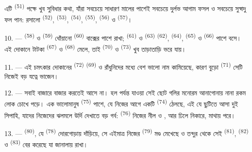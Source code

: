 এটি  \textsuperscript{(51)} পক্ষে খুব সুবিধার কথা, যাঁরা
সবচেয়ে সাধারণ মালের পাশেই সবচেয়ে দুর্লভ আগাম ফসল ও সবচেয়ে সুস্বাদু ফল পান:
রসালো  \textsuperscript{(52)}, 
\textsuperscript{(53)},  \textsuperscript{(54)}, 
\textsuperscript{(55)},  \textsuperscript{(56)} ও 
\textsuperscript{(57)}।

\VUsaut{4.0mm}
\VUsaut{3.0mm}

10. ---  \textsuperscript{(58)} ও  \textsuperscript{(59)}
ধোঁয়ানো  \textsuperscript{(60)} বাক্সের পাশে রাখা;
 \textsuperscript{(61)} ও  \textsuperscript{(63)}
 \textsuperscript{(62)},  \textsuperscript{(64)},
 \textsuperscript{(65)} ও 
\textsuperscript{(66)} পাশে বসে। এই দোকানে টাটকা 
\textsuperscript{(67)} ও  \textsuperscript{(68)} মেলে, তাই
 \textsuperscript{(70)} ও  \textsuperscript{(73)}
খুব তাড়াতাড়ি ভরে যায়।

11. --- এই চমৎকার দোকানের  \textsuperscript{(72)}
 \textsuperscript{(69)} ও রাঁধুনিদের মধ্যে বেশ ভালো নাম
কামিয়েছে, কারণ বুড়ো  \textsuperscript{(71)} সেটি নিজেই বড়
যত্নে ভাজেন।

\VUsaut{4.0mm}
\VUsaut{3.0mm}

12. --- সবাই বাজারে বাজার করতেই আসে না। হল পর্যন্ত যাওয়া সেই ছোট গলির মনোরম
আনাগোনায় নানা রকম লোক চোখে পড়ে। এক ভালোমানুষ 
\textsuperscript{(75)} পাশে, যে নিজের আগে একটি  \textsuperscript{(74)}
ঠেলছে, এই যে ছুটিতে আসা দুই সিপাহি, যাদের নিজেদের ঝলমলে উর্দি দেখাতে বড় গর্ব:
 \textsuperscript{(76)} নিজের নীল  ও
, আর  ঢিলে নিকারে, মাথায়
 পরে।

13. ---  \textsuperscript{(80)}, যে 
\textsuperscript{(78)} দোরগোড়ায় দাঁড়িয়ে, সে এইমাত্র নিজের 
\textsuperscript{(79)} মণ্ড মেখেছে ও তন্দুর থেকে সেই 
\textsuperscript{(81)},  \textsuperscript{(82)} ও  \textsuperscript{(83)} বের করেছে যা জানালায় রাখা।

